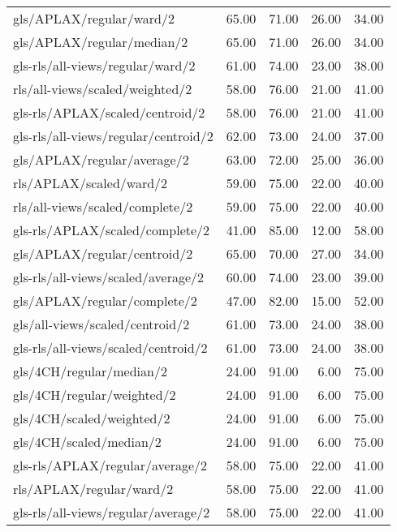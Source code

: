 \begin{longtable}{lrrrr}
    gls/APLAX/regular/ward/2                  & 65.00 & 71.00 & 26.00 & 34.00 \\
    gls/APLAX/regular/median/2                & 65.00 & 71.00 & 26.00 & 34.00 \\
    gls-rls/all-views/regular/ward/2          & 61.00 & 74.00 & 23.00 & 38.00 \\
    rls/all-views/scaled/weighted/2           & 58.00 & 76.00 & 21.00 & 41.00 \\
    gls-rls/APLAX/scaled/centroid/2           & 58.00 & 76.00 & 21.00 & 41.00 \\
    gls-rls/all-views/regular/centroid/2      & 62.00 & 73.00 & 24.00 & 37.00 \\
    gls/APLAX/regular/average/2               & 63.00 & 72.00 & 25.00 & 36.00 \\
    rls/APLAX/scaled/ward/2                   & 59.00 & 75.00 & 22.00 & 40.00 \\
    rls/all-views/scaled/complete/2           & 59.00 & 75.00 & 22.00 & 40.00 \\
    gls-rls/APLAX/scaled/complete/2           & 41.00 & 85.00 & 12.00 & 58.00 \\
    gls/APLAX/regular/centroid/2              & 65.00 & 70.00 & 27.00 & 34.00 \\
    gls-rls/all-views/scaled/average/2        & 60.00 & 74.00 & 23.00 & 39.00 \\
    gls/APLAX/regular/complete/2              & 47.00 & 82.00 & 15.00 & 52.00 \\
    gls/all-views/scaled/centroid/2           & 61.00 & 73.00 & 24.00 & 38.00 \\
    gls-rls/all-views/scaled/centroid/2       & 61.00 & 73.00 & 24.00 & 38.00 \\
    gls/4CH/regular/median/2                  & 24.00 & 91.00 &  6.00 & 75.00 \\
    gls/4CH/regular/weighted/2                & 24.00 & 91.00 &  6.00 & 75.00 \\
    gls/4CH/scaled/weighted/2                 & 24.00 & 91.00 &  6.00 & 75.00 \\
    gls/4CH/scaled/median/2                   & 24.00 & 91.00 &  6.00 & 75.00 \\
    gls-rls/APLAX/regular/average/2           & 58.00 & 75.00 & 22.00 & 41.00 \\
    rls/APLAX/regular/ward/2                  & 58.00 & 75.00 & 22.00 & 41.00 \\
    gls-rls/all-views/regular/average/2       & 58.00 & 75.00 & 22.00 & 41.00 \\

\end{longtable}
